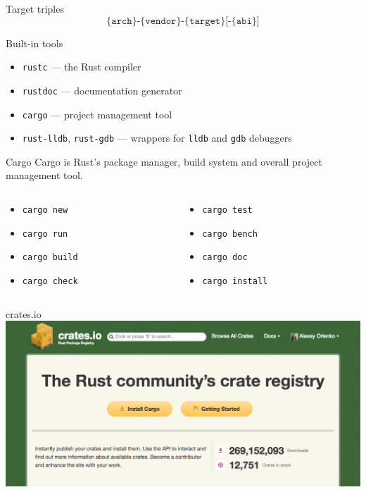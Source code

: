 \documentclass[12pt, aspectratio=169]{beamer}
\begin{document}
\begin{frame}{Target triples}
  \[\texttt{\{arch\}-\{vendor\}-\{target\}[-\{abi\}]}\]
\end{frame}

\begin{frame}{Built-in tools}
  \begin{itemize}
    \item \texttt{rustc} --- the Rust compiler
    \item \texttt{rustdoc} --- documentation generator
    \item \texttt{cargo} --- project management tool
    \item \texttt{rust-lldb}, \texttt{rust-gdb} --- wrappers for \texttt{lldb}
      and \texttt{gdb} debuggers
  \end{itemize}
\end{frame}

\begin{frame}{Cargo}
  Cargo is Rust's package manager, build system and overall project management
  tool.

  \begin{columns}
    \begin{column}{0.3\textwidth}
      \begin{itemize}
        \item \texttt{cargo new}
        \item \texttt{cargo run}
        \item \texttt{cargo build}
        \item \texttt{cargo check}
      \end{itemize}
    \end{column}

    \begin{column}{0.5\textwidth}
      \begin{itemize}
        \item \texttt{cargo test}
        \item \texttt{cargo bench}
        \item \texttt{cargo doc}
        \item \texttt{cargo install}
      \end{itemize}
    \end{column}
  \end{columns}
\end{frame}

\begin{frame}{crates.io}
  \includegraphics[width=\textwidth]{images/crates-io.png}
\end{frame}
\end{document}
